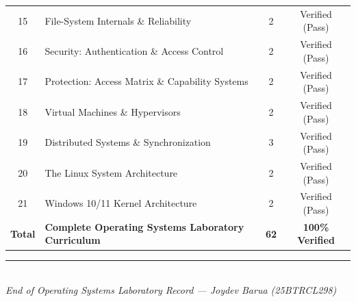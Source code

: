 \documentclass[11pt,a4paper]{report}
\begin{document}
\begin{center}
\begin{tabular}{@{}clcc@{}}
15 & File-System Internals \& Reliability & 2 & Verified (Pass) \\
16 & Security: Authentication \& Access Control & 2 & Verified (Pass) \\
17 & Protection: Access Matrix \& Capability Systems & 2 & Verified (Pass) \\
18 & Virtual Machines \& Hypervisors & 2 & Verified (Pass) \\
19 & Distributed Systems \& Synchronization & 3 & Verified (Pass) \\
20 & The Linux System Architecture & 2 & Verified (Pass) \\
21 & Windows 10/11 Kernel Architecture & 2 & Verified (Pass) \\
\midrule
\textbf{Total} & \textbf{Complete Operating Systems Laboratory Curriculum} & \textbf{62} & \textbf{100\% Verified} \\
\bottomrule
\end{tabular}
\end{center}
\vspace{12pt}
\begin{center}
\textcolor{rulegray}{\rule{0.6\textwidth}{0.6pt}}\\[4pt]
{\small\textit{End of Operating Systems Laboratory Record --- Joydev Barua (25BTRCL298)}}
\end{center}
\end{document}
